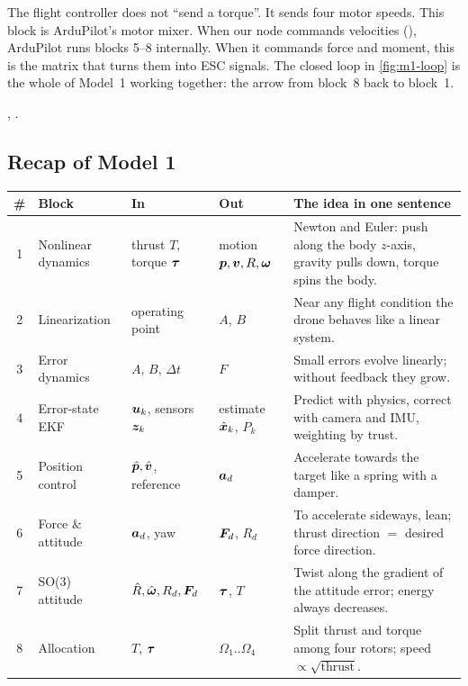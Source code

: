 \begin{projbox}
The flight controller does not ``send a torque''. It sends four motor speeds. This block is ArduPilot's motor
mixer. When our node commands velocities (), ArduPilot runs blocks 5--8 internally. When it
commands force and moment, this is the matrix that turns them into ESC signals. The closed loop in
\cref{fig:m1-loop} is the whole of Model~1 working together: the arrow from block~8 back to block~1.
\end{projbox}

\begin{codebox}
\intoy {}, .
\end{codebox}

\subsection{Recap of Model 1}
\label{sec:m1recap}

\begin{center}\small
\begin{tabularx}{\linewidth}{@{}c >{\raggedright\arraybackslash}p{2.9cm} >{\raggedright\arraybackslash}p{3.2cm} >{\raggedright\arraybackslash}p{3.0cm} X@{}}
\toprule
\textbf{\#} & \textbf{Block} & \textbf{In} & \textbf{Out} & \textbf{The idea in one sentence}\\
\midrule
1 & Nonlinear dynamics & thrust $T$, torque $\bm{\tau}$ & motion $\bm{p},\bm{v},R,\bm{\omega}$ & Newton and Euler: push along the body $z$-axis, gravity pulls down, torque spins the body.\\
2 & Linearization & operating point & $A$, $B$ & Near any flight condition the drone behaves like a linear system.\\
3 & Error dynamics & $A$, $B$, $\Delta t$ & $F$ & Small errors evolve linearly; without feedback they grow.\\
4 & Error-state EKF & $\bm{u}_k$, sensors $\bm{z}_k$ & estimate $\hat{\bm x}_k$, $P_k$ & Predict with physics, correct with camera and IMU, weighting by trust.\\
5 & Position control & $\hat{\bm p},\hat{\bm v}$, reference & $\bm{a}_d$ & Accelerate towards the target like a spring with a damper.\\
6 & Force \& attitude & $\bm{a}_d$, yaw & $\bm{F}_d$, $R_d$ & To accelerate sideways, lean; thrust direction $=$ desired force direction.\\
7 & SO(3) attitude & $\hat{R},\hat{\bm\omega},R_d,\bm{F}_d$ & $\bm{\tau}$, $T$ & Twist along the gradient of the attitude error; energy always decreases.\\
8 & Allocation & $T$, $\bm{\tau}$ & $\Omega_1..\Omega_4$ & Split thrust and torque among four rotors; speed $\propto\sqrt{\text{thrust}}$.\\
\bottomrule
\end{tabularx}
\end{center}
